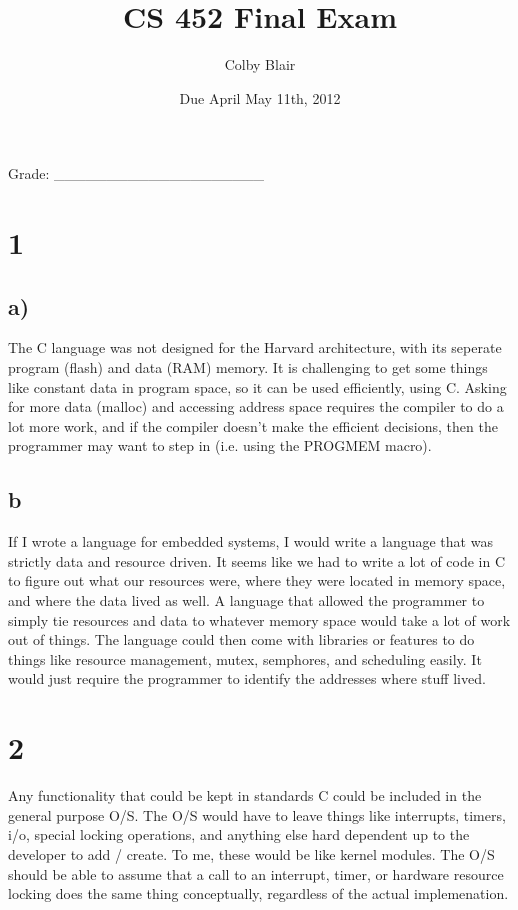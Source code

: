 \documentclass[11pt,letterpaper]{article}
\date{Due April May 11th, 2012}
\title{CS 452 Final Exam}
\author{Colby Blair}
\begin{document}
\maketitle

\begin{center}

Grade: \_\_\_\_\_\_\_\_\_\_\_\_\_\_\_\_\_\_\_\_
\end{center}

\thispagestyle{empty}

\pagebreak


\section*{1}

\subsection*{a)}
The C language was not designed for the Harvard architecture, with its seperate program (flash) and 
data (RAM) memory. It is challenging to get some things like constant data in program space, so it can
be used efficiently, using C. Asking for more data (malloc) and accessing address space requires the 
compiler to do a lot more work, and if the compiler doesn't make the efficient decisions, then the 
programmer may want to step in (i.e. using the PROGMEM macro).

\subsection*{b}
If I wrote a language for embedded systems, I would write a language that was strictly data and resource 
driven. It seems like we had to write a lot of code in C to figure out what our resources were, where they 
were located in memory space, and where the data lived as well. A language that allowed the programmer 
to simply tie resources and data to whatever memory space would take a lot of work out of things. The 
language could then come with libraries or features to do things like resource management, mutex, 
semphores, and scheduling easily. It would just require the programmer to identify the addresses where
stuff lived.

\section*{2}
Any functionality that could be kept in standards C could be included in the general purpose O/S. The 
O/S would have to leave things like interrupts, timers, i/o, special locking operations, and anything else 
hard dependent up to the developer to add / create. To me, these would be like kernel modules. The O/S
should be able to assume that a call to an interrupt, timer, or hardware resource locking does the same thing
conceptually, regardless of the actual implemenation. 
\end{document}
